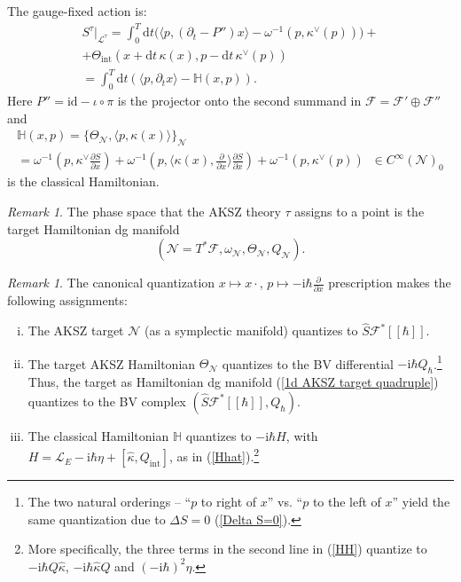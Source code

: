 \documentclass{amsart}
\theoremstyle{plain} %
\theoremstyle{definition}
\theoremstyle{remark}
\newtheorem{rem}[thm]{Remark}
\newcommand{\mr}{\mathrm}
\newcommand{\wh}{\widehat}
\newcommand{\F}{\mathcal{F}}
\newcommand{\LL}{\mathcal{L}}
\newcommand{\dd}{\partial}
\newcommand{\ii}{\mathrm{int}}
\newcommand{\iii}{\mathrm{i}}
\newcommand{\fun}{\widehat{S}\mathcal{F}^*[[\hbar]]}
\newcommand{\N}{\mathcal{N}}
\newcommand{\dr}{\mathrm{d}}
\begin{document}
The gauge-fixed action is:
\begin{multline}\label{S^tau on L^tau}
    S^\tau|_{\LL^\tau} = \int_0^T \dr t \big( \langle p, (\dd_t-P'')x \rangle - \omega^{-1}(p,\kappa^\vee(p)) \big)+ \\
    + \Theta_\ii(x+\dr t\,\kappa(x),p-\dr t\, \kappa^\vee(p))\\
    = \int_0^T \dr t (\langle p,\dd_t x \rangle-\mathbb{H}(x,p)).
\end{multline}
Here $P''=\mr{id}-\iota\circ \pi$ is the projector onto the second summand in $\F=\F'\oplus \F''$ and
\begin{multline}\label{HH}
    \mathbb{H}(x,p)=\{\Theta_\N,\big\langle p,\kappa(x) \big\rangle\}_\N\\
    = \omega^{-1}\left(p,\kappa^\vee \frac{\dd S}{\dd x}\right)+
    \omega^{-1}\left(p,\Big\langle \kappa(x),\frac{\dd}{\dd x} \Big\rangle \frac{\dd S}{\dd x}\right)+\omega^{-1}(p,\kappa^\vee(p))\;\; \in C^\infty(\N)_0
\end{multline}
is the classical Hamiltonian.

\begin{rem}
    The phase space that the AKSZ theory $\tau$ assigns to a point is the target Hamiltonian dg manifold 
    \begin{equation}\label{1d AKSZ target quadruple}
    (\N=T^*\F,\omega_\N,\Theta_\N,Q_\N).
    \end{equation}
\end{rem}

\begin{rem}\label{rem: 1d AKSZ can quantization}
    The canonical quantization $x\mapsto x\cdot$, $p\mapsto -\iii\hbar \frac{\dd}{\dd x}$ prescription makes the following assignments:
    \begin{enumerate}[(i)]
        \item The AKSZ target $\N$ (as a symplectic manifold)
        quantizes to $\fun$.
        \item The target AKSZ Hamiltonian $\Theta_\N$ quantizes to the BV differential $-\iii\hbar Q_\hbar$.\footnote{The two natural orderings -- ``$p$ to right of $x$'' vs. ``$p$ to the left of $x$'' yield the same quantization due to $\Delta S=0$ (\ref{Delta S=0}).}
        Thus, the target as Hamiltonian dg manifold (\ref{1d AKSZ target quadruple})
        quantizes to the BV complex $(\fun,Q_\hbar)$.
        \item The classical Hamiltonian $\mathbb{H}$ quantizes to $-\iii\hbar H$, with
        $H=\LL_E-\iii\hbar \eta + [\wh\kappa,Q_\ii]$, as in (\ref{Hhat}).\footnote{More specifically, the three terms in the second line in (\ref{HH}) quantize to $-\iii\hbar Q\wh\kappa$, $-\iii\hbar \wh\kappa Q$ and $(-\iii\hbar)^2\eta$.}
    \end{enumerate}
\end{rem}
\end{document}
